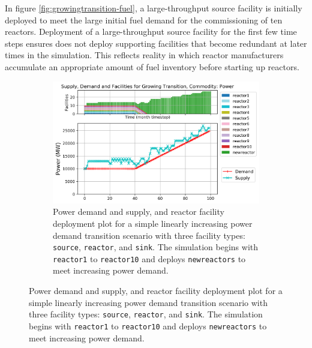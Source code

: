 In figure \ref{fig:growingtransition-fuel},
a large-throughput source facility is initially
deployed to meet the large initial fuel demand for the commissioning 
of ten reactors. 
Deployment of a large-throughput source facility for the 
first few time steps ensures \deploy does not deploy supporting
facilities that become redundant at later times in  
the simulation.
This reflects reality in which reactor manufacturers accumulate
an appropriate amount of fuel inventory before starting 
up reactors. 

\begin{figure}[]
    \centering
    \begin{subfigure}[t]{1\textwidth}
    \includegraphics[width=\linewidth]{figures/growingtransition-power.png} 
        \caption{Power demand and supply, and reactor facility deployment plot for  
        a simple linearly increasing power demand transition scenario with 
        three facility types: \texttt{source}, \texttt{reactor}, and \texttt{sink}.
        The simulation begins with \texttt{reactor1} to \texttt{reactor10} and \deploy 
        deploys \texttt{newreactors} to meet increasing power demand. }
        \label{fig:growingtransition-power}
    \end{subfigure}
\end{figure}

